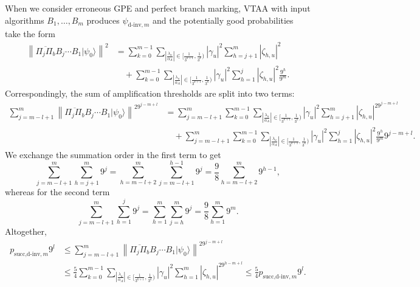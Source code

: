 \documentclass[letterpaper,onecolumn,11pt,accepted=2026-02-14]{quantumarticle}
\newcommand{\abs}[1]{\left\lvert#1\right\rvert}
\newcommand{\norm}[1]{\left\lVert#1\right\rVert}
\theoremstyle{remark}
\theoremstyle{plain}
\newcommand{\ket}[1]{|#1\rangle}
\begin{document}
When we consider erroneous GPE and perfect branch marking, VTAA with input algorithms $B_1,\ldots,B_m$ produces $\psi_{\text{d-inv},m}$ and the potentially good probabilities take the form
\begin{equation}
\begin{aligned}
    \norm{\overline{\Pi_{j}\Pi_b}B_{j}\cdots B_1\ket{\psi_0}}^2
    &=
    \sum_{k=0}^{m-1}\sum_{\abs{\frac{\lambda_u}{\alpha_A}}\in\big[\frac{1}{3^{k+1}},\frac{1}{3^k}\big)}
    \abs{\gamma_u}^2\sum_{h=j+1}^{m}\abs{\zeta_{h,u}}^2\\
    &\quad+\sum_{k=0}^{m-1}\sum_{\abs{\frac{\lambda_u}{\alpha_A}}\in\big[\frac{1}{3^{k+1}},\frac{1}{3^k}\big)}
    \abs{\gamma_u}^2\sum_{h=1}^{j}\abs{\zeta_{h,u}}^2\frac{9^{h}}{9^m}.
\end{aligned}
\end{equation}
Correspondingly, the sum of amplification thresholds are split into two terms:
\begin{equation}
\begin{aligned}
    \sum_{j=m-l+1}^{m}\norm{\overline{\Pi_{j}\Pi_b}B_{j}\cdots B_1\ket{\psi_0}}^29^{j-m+l}
    &=
    \sum_{j=m-l+1}^{m}\sum_{k=0}^{m-1}\sum_{\abs{\frac{\lambda_u}{\alpha_A}}\in\big[\frac{1}{3^{k+1}},\frac{1}{3^k}\big)}
    \abs{\gamma_u}^2\sum_{h=j+1}^{m}\abs{\zeta_{h,u}}^29^{j-m+l}\\
    &\quad+\sum_{j=m-l+1}^{m}\sum_{k=0}^{m-1}\sum_{\abs{\frac{\lambda_u}{\alpha_A}}\in\big[\frac{1}{3^{k+1}},\frac{1}{3^k}\big)}
    \abs{\gamma_u}^2\sum_{h=1}^{j}\abs{\zeta_{h,u}}^2\frac{9^{h}}{9^m}9^{j-m+l}.
\end{aligned}
\end{equation}
We exchange the summation order in the first term to get
\begin{equation}
    \sum_{j=m-l+1}^{m}\sum_{h=j+1}^{m}9^j
    =\sum_{h=m-l+2}^{m}\sum_{j=m-l+1}^{h-1}9^j
    =\frac{9}{8}\sum_{h=m-l+2}^{m}9^{h-1},
\end{equation}
whereas for the second term
\begin{equation}
    \sum_{j=m-l+1}^{m}\sum_{h=1}^{j}9^j
    =\sum_{h=1}^{m}\sum_{j=h}^{m}9^j
    =\frac{9}{8}\sum_{h=1}^{m}9^m.
\end{equation}
Altogether,
\begin{equation}
\begin{aligned}
    p_{\text{succ,d-inv},m}9^{l}
    &\leq\sum_{j=m-l+1}^{m}\norm{\overline{\Pi_{j}\Pi_b}B_{j}\cdots B_1\ket{\psi_0}}^29^{j-m+l}\\
    &\leq\frac{5}{4}\sum_{k=0}^{m-1}\sum_{\abs{\frac{\lambda_u}{\alpha_A}}\in\big[\frac{1}{3^{k+1}},\frac{1}{3^k}\big)}\abs{\gamma_u}^2
    \sum_{h=1}^{m}\abs{\zeta_{h,u}}^29^{h-m+l}
    \leq \frac{5}{4}p_{\text{succ,d-inv},m}9^{l}.
\end{aligned}
\end{equation}
\end{document}
